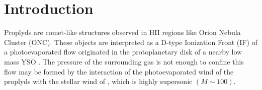 \section{Introduction}
\label{sec:introduction-proplyd}

Proplyds are comet-like structures observed in HII regions like Orion Nebula Cluster (ONC). 
These objects are interpreted as a D-type Ionization Front (IF) of a photoevaporated flow 
originated in the protoplanetary disk of a nearby low mass YSO \citep{Johnstone:1998}.
The pressure of the surrounding gas is not enough to confine this flow \citep{HA:1998}
may be formed by the interaction of the photoevaporated wind of the proplyds with the stellar wind of \thC{}, which is highly supersonic $(M \sim 100)$. 


